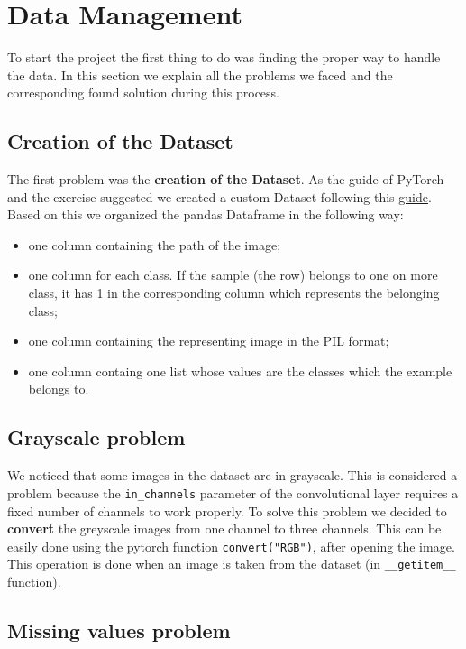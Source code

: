 \section{Data Management}
To start the project the first thing to do was finding the proper way to handle the data. In this section we explain all the problems we faced and the corresponding found solution during this process.

\subsection{Creation of the Dataset}
The first problem was the \textbf{creation of the Dataset}. As the guide of PyTorch and the exercise suggested we created a custom Dataset following this \href{https://github.com/utkuozbulak/pytorch-custom-dataset-examples}{guide}. Based on this we organized the pandas Dataframe in the following way:
\begin{itemize}
	\item one column containing the path of the image;
	\item one column for each class. If the sample (the row) belongs to one on more class, it has 1 in the corresponding column which represents the belonging class;
	\item one column containing the representing image in the PIL format;
	\item one column containg one list whose values are the classes which the example belongs to.
\end{itemize}

\subsection{Grayscale problem}

We noticed that some images in the dataset are in grayscale. This is considered a problem because the \texttt{in\_channels} parameter of the convolutional layer requires a fixed number of channels to work properly. To solve this problem we decided to \textbf{convert} the greyscale images from one channel to three channels. This can be easily done using the pytorch function \texttt{convert("RGB")}, after opening the image.
This operation is done when an image is taken from the dataset (in \texttt{\_\_getitem\_\_} function).

\subsection{Missing values problem}

